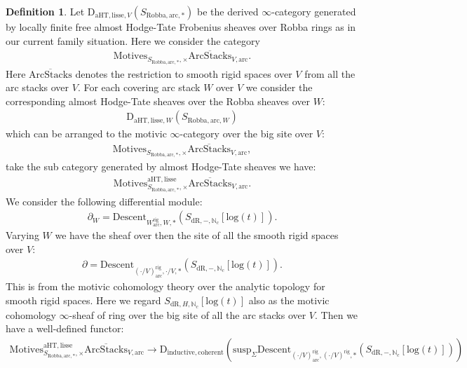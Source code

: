 \documentclass[12pt]{article}
\theoremstyle{definition}
\newtheorem{definition}{Definition}
\begin{document}
\begin{definition}
Let $\mathrm{D}_{\mathrm{aHT},\mathrm{lisse},V}(S_{\mathrm{Robba},\mathrm{arc},*})$ be the derived $\infty$-category generated by locally finite free almost Hodge-Tate Frobenius sheaves over Robba rings as in our current family situation. Here we consider the category 
\begin{align}
\mathrm{Motives}_{S_{\mathrm{Robba},\mathrm{arc},*},\times}\overline{\mathrm{ArcStacks}}_{V,\mathrm{arc}}.
\end{align}
Here $\overline{\mathrm{ArcStacks}}$ denotes the restriction to smooth rigid spaces over $V$ from all the arc stacks over $V$. For each covering arc stack $W$ over $V$ we consider the corresponding almost Hodge-Tate sheaves over the Robba sheaves over $W$:
\begin{align}
\mathrm{D}_{\mathrm{aHT},\mathrm{lisse},W}(S_{\mathrm{Robba},\mathrm{arc},W})
\end{align}
which can be arranged to the motivic $\infty$-category over the big site over $V$:
\begin{align}
\mathrm{Motives}_{S_{\mathrm{Robba},\mathrm{arc},*},\times}\overline{\mathrm{ArcStacks}}_{V,\mathrm{arc}},
\end{align}
take the sub category generated by almost Hodge-Tate sheaves we have:
\begin{align}
\mathrm{Motives}^{\mathrm{aHT},\mathrm{lisse}}_{S_{\mathrm{Robba},\mathrm{arc},*},\times}\overline{\mathrm{ArcStacks}}_{V,\mathrm{arc}}.
\end{align}
We consider the following differential module:
\begin{align}
\partial_W=\mathrm{Descent}_{W^\mathrm{rig}_\mathrm{arc},W,*}(S_{\mathrm{dR},-,\mathbb{N}_c}[\mathrm{log}(t)]).
\end{align}
Varying $W$ we have the sheaf over then the site of all the smooth rigid spaces over $V$:
\begin{align}
\partial=\mathrm{Descent}_{(\cdot/V)^\mathrm{rig}_\mathrm{arc},\cdot/V,*}(S_{\mathrm{dR},-,\mathbb{N}_c}[\mathrm{log}(t)]).
\end{align}
This is from the motivic cohomology theory over the analytic topology for smooth rigid spaces. Here we regard $S_{\mathrm{dR},H,\mathbb{N}_c}[\mathrm{log}(t)]$ also as the motivic cohomology $\infty$-sheaf of ring over the big site of all the arc stacks over $V$. Then we have a well-defined functor:
\begin{align}
\mathrm{Motives}^{\mathrm{aHT},\mathrm{lisse}}_{S_{\mathrm{Robba},\mathrm{arc},*},\times}\overline{\mathrm{ArcStacks}}_{V,\mathrm{arc}}\longrightarrow \mathrm{D}_{\mathrm{inductive},\mathrm{coherent}}(\mathrm{susp}_\Sigma\mathrm{Descent}_{(\cdot/V)^\mathrm{rig}_\mathrm{arc},(\cdot/V)^\mathrm{rig},*}(S_{\mathrm{dR},-,\mathbb{N}_c}[\mathrm{log}(t)]))

\end{align}
\end{definition}
\end{document}
